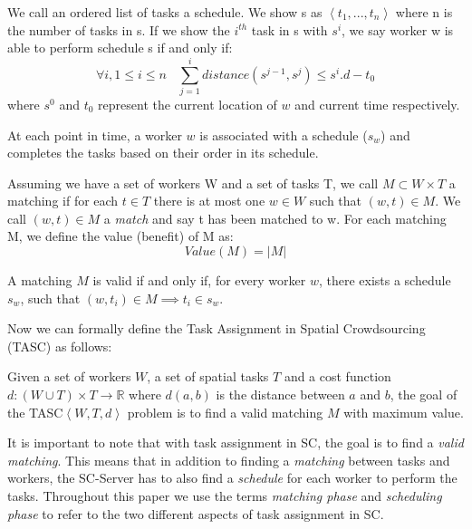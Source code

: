 \begin{definition} [Schedule]
We call an ordered list of tasks a schedule. We show s as $\left\langle t_1, ..., t_n \right\rangle$ where n is the number of tasks in s. If we show the $i^{th}$ task in s with $s^i$, we say worker w is able to perform schedule s if and only if:
\begin{equation*}
\forall i, 1\leq i \leq n \ \ \ \ \sum_{j=1}^i distance(s^{j-1}, s^j) \leq s^i.d - t_0
\end{equation*}
where $s^0$ and $t_0$ represent the current location of $w$ and current time respectively.
\end{definition}

At each point in time, a worker $w$ is associated with a schedule ($s_w$) and completes the tasks based on their order in its schedule.

\begin{definition} [Matching]
Assuming we have a set of workers W and a set of tasks T, we call $M \subset W \times T$ a matching if for each $t \in T$ there is at most one $w \in W$ such that $\left( w, t \right) \in M$. We call $\left( w, t \right) \in M$ a \emph{match} and say t has been matched to w. For each matching M, we define the value (benefit) of M as:
\begin{equation*}
Value(M) = \vert M \vert
\end{equation*}
\end{definition}

\noindent A matching $M$ is valid if and only if, for every worker $w$, there exists a schedule $s_w$, such that $(w, t_i) \in M \implies t_i \in s_w$. 

Now we can formally define the Task Assignment in Spatial Crowdsourcing (TASC) as follows:

\begin{definition}
Given a set of workers $W$, a set of spatial tasks $T$ and a cost function $d: \left( W \cup T \right) \times T \rightarrow \mathbb{R}$ where $d \left( a,b \right)$ is the distance between $a$ and $b$, the goal of the TASC$\left\langle W, T, d \right\rangle$ problem is to find a valid matching $M$ with maximum value.
\end{definition}

It is important to note that with task assignment in SC, the goal is to find a \textit{valid matching}. This means that in addition to finding a \textit{matching} between tasks and workers, the SC-Server has to also find a \textit{schedule} for each worker to perform the tasks. Throughout this paper we use the terms \textit{matching phase} and \textit{scheduling phase} to refer to the two different aspects of task assignment in SC.\\

